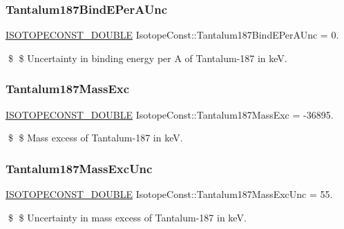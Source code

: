 \subsubsection{\texorpdfstring{Tantalum187\+Bind\+E\+Per\+A\+Unc}{Tantalum187BindEPerAUnc}}
{\footnotesize\ttfamily \mbox{\hyperlink{group___isotope_const-_macros_ga8f45a7272ce02c0b4c65c44636ed719a}{I\+S\+O\+T\+O\+P\+E\+C\+O\+N\+S\+T\+\_\+\+D\+O\+U\+B\+LE}} Isotope\+Const\+::\+Tantalum187\+Bind\+E\+Per\+A\+Unc = 0.}

\$ \$ Uncertainty in binding energy per A of Tantalum-\/187 in keV. \mbox{\label{group___isotope_const-_tantalum-_ta187_ga1f2c0406e00ca56d5aa1561ccfdbf941}} 
\subsubsection{\texorpdfstring{Tantalum187\+Mass\+Exc}{Tantalum187MassExc}}
{\footnotesize\ttfamily \mbox{\hyperlink{group___isotope_const-_macros_ga8f45a7272ce02c0b4c65c44636ed719a}{I\+S\+O\+T\+O\+P\+E\+C\+O\+N\+S\+T\+\_\+\+D\+O\+U\+B\+LE}} Isotope\+Const\+::\+Tantalum187\+Mass\+Exc = -\/36895.}

\$ \$ Mass excess of Tantalum-\/187 in keV. \mbox{\label{group___isotope_const-_tantalum-_ta187_gaf5a05c58e3a3fbe9ffeccf6bd778fa70}} 
\subsubsection{\texorpdfstring{Tantalum187\+Mass\+Exc\+Unc}{Tantalum187MassExcUnc}}
{\footnotesize\ttfamily \mbox{\hyperlink{group___isotope_const-_macros_ga8f45a7272ce02c0b4c65c44636ed719a}{I\+S\+O\+T\+O\+P\+E\+C\+O\+N\+S\+T\+\_\+\+D\+O\+U\+B\+LE}} Isotope\+Const\+::\+Tantalum187\+Mass\+Exc\+Unc = 55.}

\$ \$ Uncertainty in mass excess of Tantalum-\/187 in keV. \mbox{\label{group___isotope_const-_tantalum-_ta187_ga084c28b37da701fc8695f26b7510642e}} 
